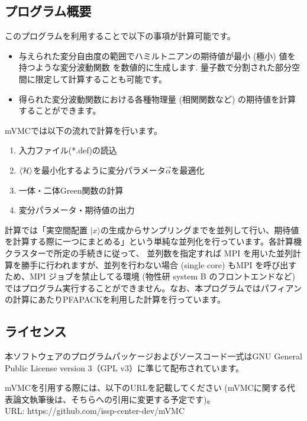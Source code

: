 \subsection{プログラム概要}
このプログラムを利用することで以下の事項が計算可能です。
\begin{itemize}
\item{与えられた変分自由度の範囲でハミルトニアンの期待値が最小 (極小) 値を持つような変分波動関数 を数値的に生成します.   量子数で分割された部分空間に限定して計算することも可能です。}
\item{得られた変分波動関数における各種物理量 (相関関数など) の期待値を計算することができます。}
\end{itemize}
mVMCでは以下の流れで計算を行います。
\begin{enumerate}
\item{入力ファイル(*.def)の読込}
\item{$\langle {\cal H} \rangle$を最小化するように変分パラメータ$\vec{\alpha}$を最適化}
\item{一体・二体Green関数の計算}
\item{変分パラメータ・期待値の出力}
\end{enumerate}
計算では「実空間配置 $|x\rangle$の生成からサンプリングまでを並列して行い、期待値を計算する際に一つにまとめる」という単純な並列化を行っています。各計算機クラスターで所定の手続きに従って、 並列数を指定すれば MPI を用いた並列計算を勝手に行われますが、並列を行わない場合 (single core) もMPI を呼び出すため、MPI ジョブを禁止してる環境 (物性研 system B のフロントエンドなど) ではプログラム実行することができません。なお、本プログラムではパフィアンの計算にあたりPFAPACKを利用した計算を行っています\cite{PFAPACK}。

\subsection{ライセンス}
本ソフトウェアのプログラムパッケージおよびソースコード一式はGNU General Public License version 3（GPL v3）に準じて配布されています。

mVMCを引用する際には、以下のURLを記載してください
(mVMCに関する代表論文執筆後は、そちらへの引用に変更する予定です)。\\
URL: https://github.com/issp-center-dev/mVMC

